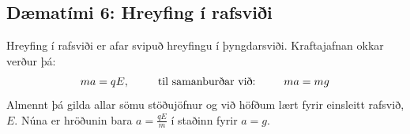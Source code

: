 \newpage

\subsection*{Dæmatími 6: Hreyfing í rafsviði}

\begin{tcolorbox}
Hreyfing í rafsviði er afar svipuð hreyfingu í þyngdarsviði. Kraftajafnan okkar verður þá:
\begin{align*}
    ma = qE, \hspace{0.9cm} \text{til samanburðar við:} \hspace{0.9cm} ma = mg
\end{align*}
Almennt þá gilda allar sömu stöðujöfnur og við höfðum lært fyrir einsleitt rafsvið, $E$. Núna er hröðunin bara $a = \frac{qE}{m}$ í staðinn fyrir $a = g$.
\end{tcolorbox}

